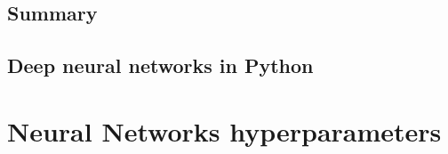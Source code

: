 \documentclass[4apaper,12pt]{book}
\begin{document}
\section{Summary}
\begin{description}
\item
\end{description}

\section{Deep neural networks in Python}
\begin{description}
\item
\end{description}

\chapter {Neural Networks hyperparameters}
\end{document}
